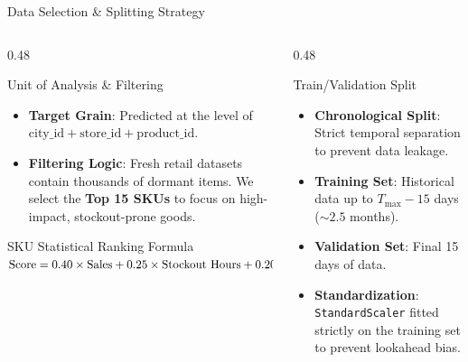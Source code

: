 \documentclass[10pt, aspectratio=169]{beamer}
\begin{document}
\begin{frame}{Data Selection \& Splitting Strategy}
  \begin{columns}[T]
    \begin{column}{0.48\textwidth}
      \begin{block}{Unit of Analysis \& Filtering}
        \begin{itemize}
          \item \textbf{Target Grain}: Predicted at the level of $\text{city\_id} + \text{store\_id} + \text{product\_id}$.
          \item \textbf{Filtering Logic}: Fresh retail datasets contain thousands of dormant items. We select the \textbf{Top 15 SKUs} to focus on high-impact, stockout-prone goods.
        \end{itemize}
      \end{block}
      
      \begin{block}{SKU Statistical Ranking Formula}
        \small
        $\text{Score} = 0.40 \times \text{Sales} + 0.25 \times \text{Stockout Hours} \\ + 0.20 \times \text{Stockout Days} + 0.15 \times \text{Sales Std}$
      \end{block}
    \end{column}
    
    \begin{column}{0.48\textwidth}
      \begin{exampleblock}{Train/Validation Split}
        \begin{itemize}
          \item \textbf{Chronological Split}: Strict temporal separation to prevent data leakage.
          \item \textbf{Training Set}: Historical data up to $T_{\max} - 15$ days ($\sim 2.5$ months).
          \item \textbf{Validation Set}: Final 15 days of data.
          \item \textbf{Standardization}: \texttt{StandardScaler} fitted strictly on the training set to prevent lookahead bias.
        \end{itemize}
      \end{exampleblock}
    \end{column}
  \end{columns}
\end{frame}
\end{document}
